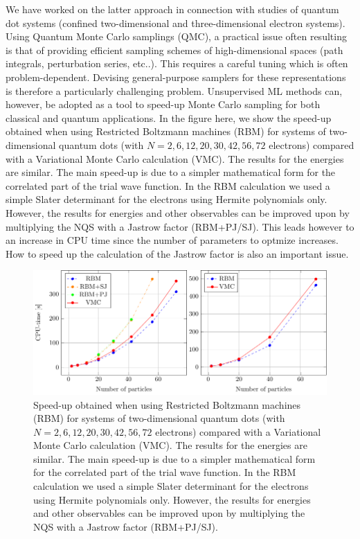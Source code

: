 \documentclass[aip,jcp,reprint,floatfix]{revtex4-1}
\begin{document}
We have worked on the latter approach in connection with studies of
quantum dot systems (confined two-dimensional and three-dimensional
electron systems).  Using Quantum Monte Carlo samplings (QMC), a
practical issue often resulting is that of providing efficient
sampling schemes of high-dimensional spaces (path integrals,
perturbation series, etc..). This requires a careful tuning which is often
problem-dependent.  Devising general-purpose samplers for these
representations is therefore a particularly challenging
problem. Unsupervised ML methods can, however, be adopted as a tool to
speed-up Monte Carlo sampling for both classical and quantum
applications. In the figure here, we show the speed-up obtained when
using Restricted Boltzmann machines (RBM) for systems of
two-dimensional quantum dots (with $N=2,6,12,20,30,42,56,72$
electrons) compared with a Variational Monte Carlo calculation
(VMC). The results for the energies are similar. The main speed-up is
due to a simpler mathematical form for the correlated part of the
trial wave function. In the RBM calculation we used a simple Slater
determinant for the electrons using Hermite polynomials only. However,
the results for energies and other observables can be improved upon by
multiplying the NQS with a Jastrow factor (RBM+PJ/SJ). This leads
however to an increase in CPU time  since the number of parameters to optmize
increases. How to speed up the calculation of the Jastrow factor is
also an important issue.
\begin{figure}[hbtp]
        \centering
        \includegraphics[scale=0.5]{fig1.pdf}
        \caption{Speed-up obtained when
using Restricted Boltzmann machines (RBM) for systems of
two-dimensional quantum dots (with $N=2,6,12,20,30,42,56,72$
electrons) compared with a Variational Monte Carlo calculation
(VMC). The results for the energies are similar. The main speed-up is
due to a simpler mathematical form for the correlated part of the
trial wave function. In the RBM calculation we used a simple Slater
determinant for the electrons using Hermite polynomials only. However,
the results for energies and other observables can be improved upon by
multiplying the NQS with a Jastrow factor (RBM+PJ/SJ).}
\end{figure}
\end{document}
